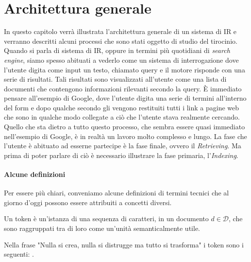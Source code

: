 \section{Architettura generale}
In questo capitolo verrà illustrata l'architettura generale di un sistema di IR e verranno
descritti alcuni processi che sono stati oggetto di studio del tirocinio.
Quando si parla di sistema di IR, oppure in termini più quotidiani di \textit{search engine},
siamo spesso abituati a vederlo come un sistema di interrogazione dove l'utente
digita come input un testo, chiamato query e il motore risponde con una serie di risultati. Tali risultati
sono visualizzati all'utente come una lista di documenti che contengono informazioni
rilevanti secondo la query.
\`E immediato pensare all'esempio di Google, dove l'utente digita una serie di termini
all'interno del  form e dopo qualche secondo gli vengono restituiti tutti i link a pagine web che
sono in qualche modo collegate a ciò che l'utente stava realmente cercando.
Quello che sta dietro a tutto questo processo, che sembra essere quasi immediato nell'esempio di Google, è
in realtà un lavoro molto complesso e lungo.
La fase che l'utente è abituato ad esserne partecipe è la fase finale, ovvero
il \textit{Retrieving}. Ma prima di poter parlare di ciò è necessario illustrare la fase primaria, l'\textit{Indexing}.

\paragraph{Alcune definizioni}
Per essere più chiari, conveniamo alcune definizioni di termini tecnici che al giorno d'oggi possono essere attribuiti
a concetti diversi.

\begin{definizione}\label{def:token}
	Un token è un'istanza di una sequenza di caratteri, in un documento $d \in \mathcal{D}$, che
	sono raggruppati tra di loro come un'unità semanticalmente utile.
\end{definizione}

\begin{esempio}[tokenizzazione]
	Nella frase "Nulla si crea, nulla si distrugge ma tutto si trasforma" i token sono i seguenti:
	     
	   .
\end{esempio}

